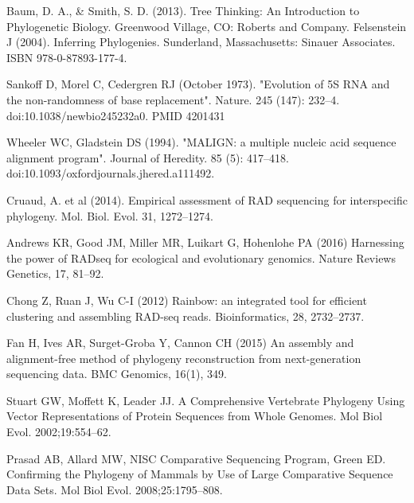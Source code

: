 \documentclass[a4paper]{article}
\begin{document}
\vspace{6cm}
%
\begin{thebibliography}{10}

Baum, D. A., & Smith, S. D. (2013). Tree Thinking: An Introduction to Phylogenetic Biology. Greenwood Village, CO: Roberts and Company.
Felsenstein J (2004). Inferring Phylogenies. Sunderland, Massachusetts: Sinauer Associates. ISBN 978-0-87893-177-4.

Sankoff D, Morel C, Cedergren RJ (October 1973). "Evolution of 5S RNA and the non-randomness of base replacement". Nature. 245 (147): 232–4. doi:10.1038/newbio245232a0. PMID 4201431

Wheeler WC, Gladstein DS (1994). "MALIGN: a multiple nucleic acid sequence alignment program". Journal of Heredity. 85 (5): 417–418. doi:10.1093/oxfordjournals.jhered.a111492.

Cruaud, A. et al (2014). Empirical assessment of RAD sequencing for interspecific phylogeny. Mol. Biol. Evol. 31, 1272–1274.

Andrews KR, Good JM, Miller MR, Luikart G, Hohenlohe PA (2016) Harnessing the power of
RADseq for ecological and evolutionary genomics. Nature Reviews Genetics, 17, 81–92. 

Chong Z, Ruan J, Wu C-I (2012) Rainbow: an integrated tool for efficient clustering and
assembling RAD-seq reads. Bioinformatics, 28, 2732–2737. 

Fan H, Ives AR, Surget-Groba Y, Cannon CH (2015) An assembly and alignment-free method of
phylogeny reconstruction from next-generation sequencing data. BMC Genomics, 16(1), 349.

Stuart GW, Moffett K, Leader JJ. A Comprehensive Vertebrate Phylogeny Using Vector Representations of Protein Sequences from Whole Genomes. Mol Biol Evol. 2002;19:554–62.

Prasad AB, Allard MW, NISC Comparative Sequencing Program, Green ED. Confirming the Phylogeny of Mammals by Use of Large Comparative Sequence Data Sets. Mol Biol Evol. 2008;25:1795–808.
\end{thebibliography}
\end{document}
